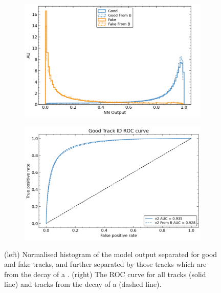 \begin{figure}[!htbp]
  \centering
  \begin{subfigure}[b]{0.48\textwidth}
      \centering
      \includegraphics[width=\textwidth]{chapters/track_classifier/figs/track_classifier_ouput.pdf}
  \end{subfigure}
  \quad
  \begin{subfigure}[b]{0.48\textwidth}
      \centering
      \includegraphics[width=\textwidth]{chapters/track_classifier/figs/track_classifier_roc.pdf}
  \end{subfigure}
  \caption{
    (left) Normalised histogram of the model output separated for good and fake tracks, and further separated by those tracks which are from the decay of a \bhadron.
    (right) The ROC curve for all tracks (solid line) and tracks from the decay of a \bhadron (dashed line).
  }
  \label{fig:track_classifier_output_roc}
\end{figure}

